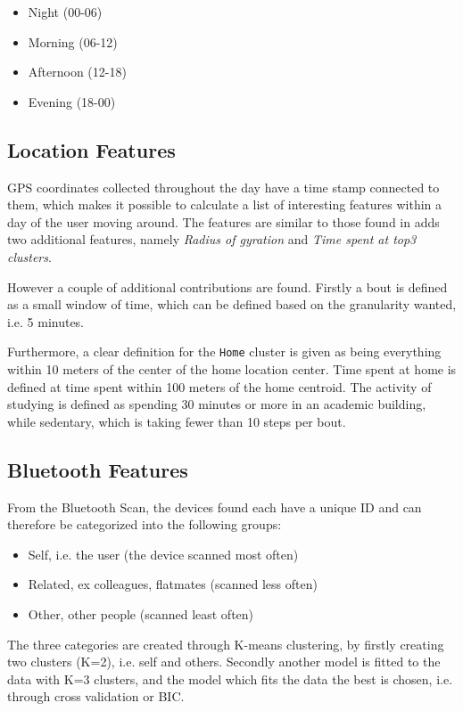 \begin{itemize}
\item Night (00-06)
\item Morning (06-12)
\item Afternoon (12-18)
\item Evening (18-00)
\end{itemize}

\subsection{Location Features}
GPS coordinates collected throughout the day have a time stamp connected to them, which makes it possible to calculate a list of interesting features within a day of the user moving around. The features are similar to those found in \cite{Saeb2015} adds two additional features, namely \textit{Radius of gyration} and \textit{Time spent at top3 clusters}.

However a couple of additional contributions are found. Firstly a bout is defined as a small window of time, which can be defined based on the granularity wanted, i.e. 5 minutes. 

Furthermore, a clear definition for the \verb|Home| cluster is given as being everything within 10 meters of the center of the home location center. Time spent at home is defined at time spent within 100 meters of the home centroid. The activity of studying is defined as spending 30 minutes or more in an academic building, while sedentary, which is taking fewer than 10 steps per bout.

\subsection{Bluetooth Features}
From the Bluetooth Scan, the devices found each have a unique ID and can therefore be categorized into the following groups:

\begin{itemize}
    \item Self, i.e. the user (the device scanned most often)
    \item Related, ex colleagues, flatmates (scanned less often)
    \item Other, other people (scanned least often)
\end{itemize}

The three categories are created through K-means clustering, by firstly creating two clusters (K=2), i.e. self and others. Secondly another model is fitted to the data with K=3 clusters, and the model which fits the data the best is chosen, i.e. through cross validation or BIC.


